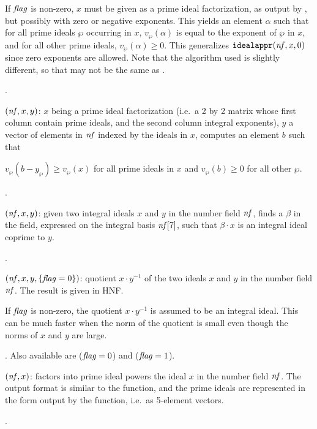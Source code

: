If $\hbox{\it f\kern0pt lag\/}$ is non-zero, $x$ must be given as a prime ideal factorization, as
output by , but possibly with zero or negative exponents.
This yields an element $\alpha$ such that for all prime ideals $\wp$ occurring
in $x$, $v_{\wp}(\alpha)$ is equal to the exponent of $\wp$ in $x$, and for all
other prime ideals, $v_{\wp}(\alpha)\ge0$. This generalizes
${\tt idealappr}(\hbox{\it nf\/},x,0)$ since zero exponents are allowed. Note that
the algorithm used is slightly different, so that
 may not be the same as
.

.

$(\hbox{\it nf\/},x,y)$: $x$ being a prime ideal factorization
(i.e.~a 2 by 2 matrix whose first column contain prime ideals, and the second
column integral exponents), $y$ a vector of elements in $\hbox{\it nf\/}$ indexed by
the ideals in $x$, computes an element $b$ such that

$v_\wp(b - y_\wp) \geq v_\wp(x)$ for all prime ideals in $x$ and $v_\wp(b)\geq 0$
for all other $\wp$.

.

$(\hbox{\it nf\/},x,y)$: given two integral ideals $x$ and $y$
in the number field $\hbox{\it nf\/}$, finds a $\beta$ in the field, expressed on the
integral basis $\hbox{\it nf\/}[7]$, such that $\beta\cdot x$ is an integral ideal
coprime to $y$.

.

$(\hbox{\it nf\/},x,y,\{\hbox{\it f\kern0pt lag\/}=0\})$: quotient $x\cdot y^{-1}$ of the
two ideals $x$ and $y$ in the number field $\hbox{\it nf\/}$. The result is given in
HNF.

If $\hbox{\it f\kern0pt lag\/}$ is non-zero, the quotient $x \cdot y^{-1}$ is assumed to be an
integral ideal. This can be much faster when the norm of the quotient is
small even though the norms of $x$ and $y$ are large.

. Also available
are  ($\hbox{\it f\kern0pt lag\/}=0$) and
 ($\hbox{\it f\kern0pt lag\/}=1$).

$(\hbox{\it nf\/},x)$: factors into prime ideal powers the
ideal $x$ in the number field $\hbox{\it nf\/}$. The output format is similar to the
 function, and the prime ideals are represented in the form
output by the  function, i.e.~as 5-element vectors.

.

